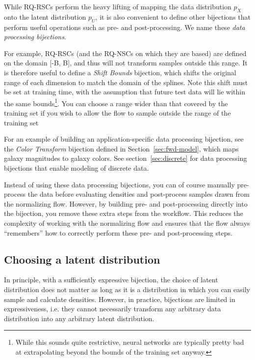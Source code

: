 \documentclass[twocolumn,twocolappendix]{aastex631}
\newcommand{\px}{p^{}_{X}}
\newcommand{\pu}{p^{}_{U}}
\begin{document}
While RQ-RSCs perform the heavy lifting of mapping the data distribution $\px$ onto the latent distribution $\pu$, it is also convenient to define other bijections that perform useful operations such as pre- and post-processing.
We name these \emph{data processing bijections}.

For example, RQ-RSCs (and the RQ-NSCs on which they are based) are defined on the domain [-B, B], and thus will not transform samples outside this range.
It is therefore useful to define a \emph{Shift Bounds} bijection, which shifts the original range of each dimension to match the domain of the splines.
Note this shift must be set at training time, with the assumption that future test data will lie within the same bounds\footnote{While this sounds quite restrictive, neural networks are typically pretty bad at extrapolating beyond the bounds of the training set anyway.}.
You can choose a range wider than that covered by the training set if you wish to allow the flow to sample outside the range of the training set

For an example of building an application-specific data processing bijection, see the \emph{Color Transform} bijection defined in Section~\ref{sec:fwd-model}, which maps galaxy magnitudes to galaxy colors.
See section~\ref{sec:discrete} for data processing bijections that enable modeling of discrete data.

Instead of using these data processing bijections, you can of course manually pre-process the data before evaluating densities and post-process samples drawn from the normalizing flow.
However, by building pre- and post-processing directly into the bijection, you remove these extra steps from the workflow.
This reduces the complexity of working with the normalizing flow and ensures that the flow always ``remembers'' how to correctly perform these pre- and post-processing steps.


\subsection{Choosing a latent distribution}
\label{sec:latent}

In principle, with a sufficiently expressive bijection, the choice of latent distribution does not matter as long as it is a distribution in which you can easily sample and calculate densities.
However, in practice, bijections are limited in expressiveness, i.e. they cannot necessarily transform any arbitrary data distribution into any arbitrary latent distribution.
\end{document}
